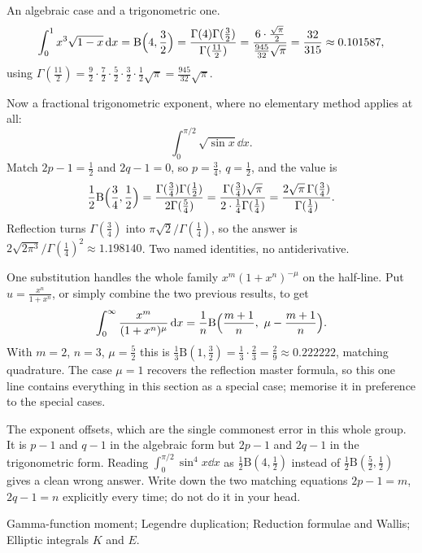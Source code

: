 \begin{worked}
An algebraic case and a trigonometric one.
\[\int_0^1x^{3}\sqrt{1-x}\,\mathrm{d} x=\mathrm{B}\Bigl(4,\frac32\Bigr)=\frac{\Gamma(4)\Gamma(\tfrac32)}{\Gamma(\tfrac{11}{2})}
=\frac{6\cdot\tfrac{\sqrt\pi}{2}}{\tfrac{945}{32}\sqrt\pi}=\frac{32}{315}\approx0.101587,\]
using $\Gamma(\tfrac{11}{2})=\tfrac92\cdot\tfrac72\cdot\tfrac52\cdot\tfrac32\cdot\tfrac12\sqrt\pi=\tfrac{945}{32}\sqrt\pi$.

Now a fractional trigonometric exponent, where no elementary method applies at all:
\[\int_0^{\pi/2}\sqrt{\sin x}\dd x.\]
Match $2p-1=\tfrac12$ and $2q-1=0$, so $p=\tfrac34$, $q=\tfrac12$, and the value is
\[\frac12\mathrm{B}\Bigl(\frac34,\frac12\Bigr)=\frac{\Gamma(\tfrac34)\Gamma(\tfrac12)}{2\Gamma(\tfrac54)}
=\frac{\Gamma(\tfrac34)\sqrt\pi}{2\cdot\tfrac14\Gamma(\tfrac14)}=\frac{2\sqrt\pi\,\Gamma(\tfrac34)}{\Gamma(\tfrac14)}.\]
Reflection turns $\Gamma(\tfrac34)$ into $\pi\sqrt2/\Gamma(\tfrac14)$, so the answer is $2\sqrt{2\pi^{3}}/\Gamma(\tfrac14)^{2}\approx1.198140$. Two named identities, no antiderivative.
\end{worked}

\begin{worked}
One substitution handles the whole family $x^{m}(1+x^{n})^{-\mu}$ on the half-line. Put $u=\tfrac{x^{n}}{1+x^{n}}$, or simply combine the two previous results, to get
\[\int_0^{\infty}\frac{x^{m}}{(1+x^{n})^{\mu}}\dd x=\frac1n\mathrm{B}\Bigl(\frac{m+1}{n},\ \mu-\frac{m+1}{n}\Bigr).\]
With $m=2$, $n=3$, $\mu=\tfrac52$ this is $\tfrac13\mathrm{B}(1,\tfrac32)=\tfrac13\cdot\tfrac23=\tfrac29\approx0.222222$, matching quadrature. The case $\mu=1$ recovers the reflection master formula, so this one line contains everything in this section as a special case; memorise it in preference to the special cases.
\end{worked}

\begin{trap}
The exponent offsets, which are the single commonest error in this whole group. It is $p-1$ and $q-1$ in the algebraic form but $2p-1$ and $2q-1$ in the trigonometric form. Reading $\int_0^{\pi/2}\sin^{4}x\dd x$ as $\tfrac12\mathrm{B}(4,\tfrac12)$ instead of $\tfrac12\mathrm{B}(\tfrac52,\tfrac12)$ gives a clean wrong answer. Write down the two matching equations $2p-1=m$, $2q-1=n$ explicitly every time; do not do it in your head.
\end{trap}

\begin{seealsob}Gamma-function moment; Legendre duplication; Reduction formulae and Wallis; Elliptic integrals $K$ and $E$.\end{seealsob}

